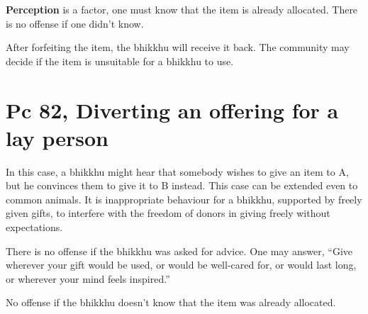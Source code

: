 \textbf{Perception} is a factor, one must know that the item is already
allocated. There is no offense if one didn't know.

After forfeiting the item, the bhikkhu will receive it back. The
community may decide if the item is unsuitable for a bhikkhu to use.

\section{Pc 82, Diverting an offering for a lay person}

In this case, a bhikkhu might hear that somebody wishes to give an item
to A, but he convinces them to give it to B instead. This case can be
extended even to common animals. It is inappropriate behaviour for a
bhikkhu, supported by freely given gifts, to interfere with the freedom
of donors in giving freely without expectations.

There is no offense if the bhikkhu was asked for advice. One may answer,
``Give wherever your gift would be used, or would be well-cared for, or
would last long, or wherever your mind feels inspired.''

No offense if the bhikkhu doesn't know that the item was already
allocated.

